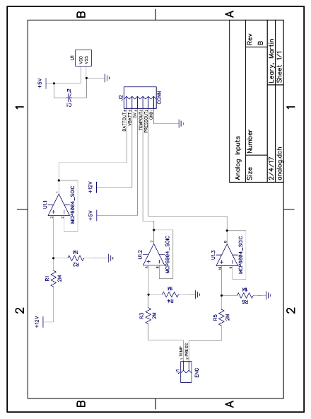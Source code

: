 \documentclass[11pt]{article}
\begin{document}
\begin{figure}[H]
    \centering
    \includegraphics[width=\textwidth]{documents/analog_schem}
\end{figure}
\end{document}
